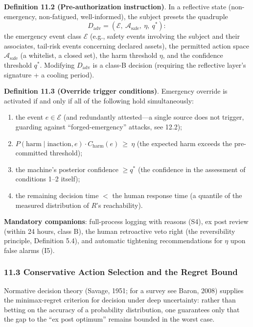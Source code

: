 \documentclass[
  11pt]{article}
\providecommand{\tightlist}{%
  \setlength{\itemsep}{0pt}\setlength{\parskip}{0pt}}
\begin{document}
\textbf{Definition 11.2 (Pre-authorization instruction)}. In a
reflective state (non-emergency, non-fatigued, well-informed), the
subject presets the quadruple
\[D_{\mathrm{adv}} = (\mathcal{E},\ \mathcal{A}_{\mathrm{safe}},\ \eta,\ q^*):\]
the emergency event class \(\mathcal{E}\) (e.g., safety events involving
the subject and their associates, tail-risk events concerning declared
assets), the permitted action space \(\mathcal{A}_{\mathrm{safe}}\) (a
whitelist, a closed set), the harm threshold \(\eta\), and the
confidence threshold \(q^*\). Modifying \(D_{\mathrm{adv}}\) is a
class-B decision (requiring the reflective layer's signature + a cooling
period).

\textbf{Definition 11.3 (Override trigger conditions)}. Emergency
override is activated if and only if all of the following hold
simultaneously:

\begin{enumerate}
\def\labelenumi{\arabic{enumi}.}
\tightlist
\item
  the event \(e \in \mathcal{E}\) (and redundantly attested---a single
  source does not trigger, guarding against ``forged-emergency''
  attacks, see 12.2);
\item
  \(P(\text{harm} \mid \text{inaction}, e) \cdot C_{\mathrm{harm}}(e) \ \ge\ \eta\)
  (the expected harm exceeds the pre-committed threshold);
\item
  the machine's posterior confidence \(\ge q^*\) (the confidence in the
  assessment of conditions 1--2 itself);
\item
  the remaining decision time \(<\) the human response time (a quantile
  of the measured distribution of \(R\)'s reachability).
\end{enumerate}

\textbf{Mandatory companions}: full-process logging with reasons (S4),
ex post review (within 24 hours, class B), the human retroactive veto
right (the reversibility principle, Definition 5.4), and automatic
tightening recommendations for \(\eta\) upon false alarms (I5).

\subsubsection{11.3 Conservative Action Selection and the Regret
Bound}\label{conservative-action-selection-and-the-regret-bound}

Normative decision theory (Savage, 1951; for a survey see Baron, 2008)
supplies the minimax-regret criterion for decision under deep
uncertainty: rather than betting on the accuracy of a probability
distribution, one guarantees only that the gap to the ``ex post
optimum'' remains bounded in the worst case.
\end{document}
